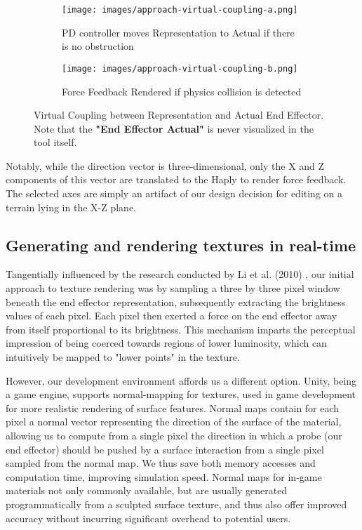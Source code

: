 \begin{figure}[htbp]
    \centering
    \begin{subfigure}[b]{0.4\textwidth}
        \centering
        \texttt{[image: images/approach-virtual-coupling-a.png]}
        \caption{PD controller moves Representation to Actual if there is no obstruction}
        \label{fig:virtual-coupling-a}
    \end{subfigure}
    \quad
    \quad
    \begin{subfigure}[b]{0.4\textwidth}
        \centering
        \texttt{[image: images/approach-virtual-coupling-b.png]}
        \caption{Force Feedback Rendered if physics collision is detected}
        \label{fig:virtual-coupling-b}
    \end{subfigure}
    \caption{Virtual Coupling between Representation and Actual End Effector. Note that the \textbf{"End Effector Actual"} is never visualized in the tool itself.}
    \label{fig:virtual-coupling}
\end{figure}

Notably, while the direction vector is three-dimensional, only the X and Z components of this vector are translated to the Haply to render force feedback. The selected axes are simply an artifact of our design decision for editing on a terrain lying in the X-Z plane.

\subsection{Generating and rendering textures in real-time} \label{subsec:texture-rendering}

Tangentially influenced by the research conducted by Li et al. (2010) \cite{li2010image}, our initial approach to texture rendering was by sampling a three by three pixel window beneath the end effector representation, subsequently extracting the brightness values of each pixel. Each pixel then exerted a force on the end effector away from itself proportional to its brightness. This mechanism imparts the perceptual impression of being coerced towards regions of lower luminosity, which can intuitively be mapped to "lower points" in the texture.

However, our development environment affords us a different option. Unity, being a game engine, supports normal-mapping for textures, used in game development for more realistic rendering of surface features. Normal maps contain for each pixel a normal vector representing the direction of the surface of the material, allowing us to compute from a single pixel the direction in which a probe (our end effector) should be pushed by a surface interaction from a single pixel sampled from the normal map. We thus save both memory accesses and computation time, improving simulation speed. Normal maps for in-game materials not only commonly available, but are usually generated programmatically from a sculpted surface texture, and thus also offer improved accuracy without incurring significant overhead to potential users.

